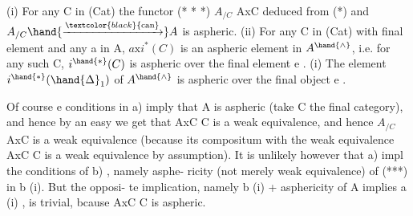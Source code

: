 
(i)   For any C in (Cat)  the functor
(* * *)   $A_{/C}$ \hand{\ensuremath{\longrightarrow}} AxC   deduced from (*)  and $A_{/C} \hand{\ensuremath{\xrightarrow{\textcolor{black}{\text{can}}}}} A$
   is aspheric.
(ii)  For any C in (Cat) with final element and any a in A,  $a\mathrm{x}i^{*}(C)$ is
an aspheric element in $A^{\hand{\wedge}}$, i.e. for any such C, $i^{\hand{*}}(C)$ is aspheric
over the final element e .
(i)   The element  $i^{\hand{*}}(\hand{\ensuremath{\Delta}}_1)$ of $A^{\hand{\wedge}}$ is aspheric over the final object e .

Of course e conditions in a) imply that A is aspheric (take  C
the final category),  and hence  by an easy 
we get that  AxC \hand{\ensuremath{\rightarrow}} C is a weak equivalence, and hence $A_{/C}$ \hand{\ensuremath{\rightarrow}} AxC is
a weak equivalence (because its compositum with the weak equivalence
AxC \hand{\ensuremath{\rightarrow}} C is a weak equivalence by assumption).  It is  unlikely however
that  a)   impl the conditions of  b) ,  namely asphe-%
ricity (not merely weak equivalence) of (***) in  b (i).   But the opposi-%
te implication,  namely  b (i)  +  asphericity of A   implies a (i) ,
is trivial,  bcause AxC \hand{\ensuremath{\rightarrow}} C is aspheric.

